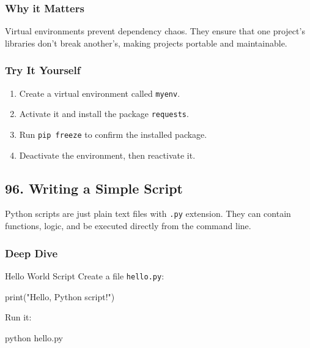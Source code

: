 \documentclass[
  letterpaper,
  DIV=11,
  numbers=noendperiod]{scrreprt}
\newenvironment{Shaded}{\begin{snugshade}}{\end{snugshade}}
\newcommand{\BuiltInTok}[1]{\textcolor[rgb]{0.00,0.23,0.31}{#1}}
\newcommand{\ExtensionTok}[1]{\textcolor[rgb]{0.00,0.23,0.31}{#1}}
\newcommand{\NormalTok}[1]{\textcolor[rgb]{0.00,0.23,0.31}{#1}}
\newcommand{\StringTok}[1]{\textcolor[rgb]{0.13,0.47,0.30}{#1}}
\providecommand{\tightlist}{%
  \setlength{\itemsep}{0pt}\setlength{\parskip}{0pt}}
\begin{document}
\subsubsection{Why it Matters}\label{why-it-matters-94}

Virtual environments prevent dependency chaos. They ensure that one
project's libraries don't break another's, making projects portable and
maintainable.

\subsubsection{Try It Yourself}\label{try-it-yourself-94}

\begin{enumerate}
\def\labelenumi{\arabic{enumi}.}
\tightlist
\item
  Create a virtual environment called \texttt{myenv}.
\item
  Activate it and install the package \texttt{requests}.
\item
  Run \texttt{pip\ freeze} to confirm the installed package.
\item
  Deactivate the environment, then reactivate it.
\end{enumerate}

\subsection{96. Writing a Simple Script}\label{writing-a-simple-script}

Python scripts are just plain text files with \texttt{.py} extension.
They can contain functions, logic, and be executed directly from the
command line.

\subsubsection{Deep Dive}\label{deep-dive-95}

Hello World Script Create a file \texttt{hello.py}:

\begin{Shaded}
\begin{Highlighting}[]
\BuiltInTok{print}\NormalTok{(}\StringTok{"Hello, Python script!"}\NormalTok{)}
\end{Highlighting}
\end{Shaded}

Run it:

\begin{Shaded}
\begin{Highlighting}[]
\ExtensionTok{python}\NormalTok{ hello.py}
\end{Highlighting}
\end{Shaded}
\end{document}
